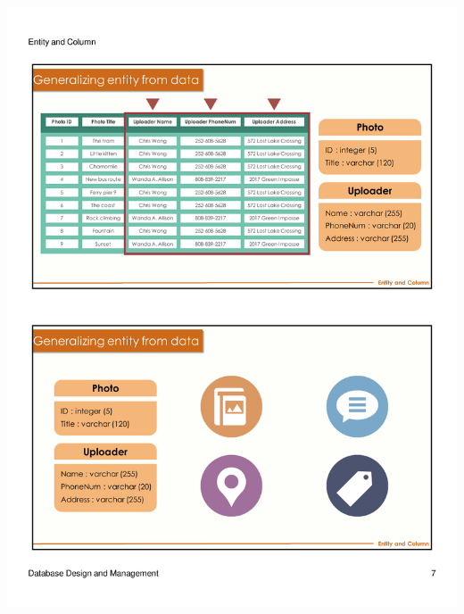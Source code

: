 \begin{frame}{ }
    \centering
    \includegraphics[width=\textwidth, trim={10mm 134mm 10mm 22mm}, clip]{resources/02/02_7}
\end{frame}
